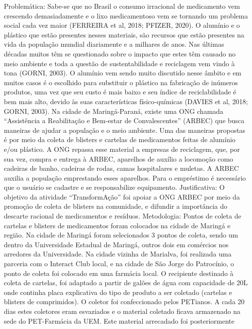 Problemática: Sabe-se que no Brasil o consumo irracional de medicamento vem crescendo 
demasiadamente e o lixo medicamentoso vem se tornando um problema social cada vez maior 
(FERREIRA et al, 2018; PFIZER, 2020). O alumínio e o plástico que estão presentes nesses 
materiais, são recursos que estão presentes na vida da população mundial diariamente e a milhares 
de anos. Nas últimas décadas muitos têm se questionado sobre o impacto que estes têm causado 
no meio ambiente e toda a questão de sustentabilidade e reciclagem vem vindo à tona (GORNI, 
2003). O alumínio vem sendo muito discutido nesse âmbito e em muitos casos é o escolhido para 
substituir o plástico na fabricação de inúmeros produtos, uma vez que seu custo é mais baixo e seu 
índice de reciclabilidade é bem mais alto, devido às suas características físico-químicas (DAVIES 
et al, 2018; GORNI, 2003). Na cidade de Maringá-Paraná, existe uma ONG chamada “Assistência 
a Reabilitação e Bem-estar de Convalescentes” (ARBEC) que busca maneiras de ajudar a 
população e o meio ambiente. Uma das maneiras propostas é por meio da coleta de blisters e 
cartelas de medicamentos feitas de alumínio e/ou plástico. A ONG repassa esse material a 
empresas de reciclagem, que, por sua vez, compra e entrega à ARBEC, aparelhos de auxílio a 
locomoção como cadeiras de banho, cadeiras de rodas, camas hospitalares e muletas. A ARBEC 
auxilia a população emprestando esses aparelhos. Para o empréstimo é necessário que o usuário se 
cadastre e se responsabilize equipamento. Justificativa: O objetivo da atividade “TransformAção” 
foi apoiar a ONG ARBEC por meio da promoção de coleta de blisters na comunidade, e difundir 
a importância do descarte racional de medicamentos e resíduos. Metodologia: Pontos de coleta de 
cartelas e blisters de medicamentos foram colocados na cidade de Maringá e região. Na cidade de 
Maringá foram selecionados 3 pontos de coleta, sendo um dentro da Universidade Estadual de 
Maringá, outros dois em comércios nos arredores da Universidade. Na cidade vizinha de Marialva, 
foi realizada uma parceria com o Interact Club local, e na cidade de São Jorge do Patrocínio, o 
ponto de coleta foi colocado em uma farmácia local. O recipiente destinado à coleta de cartelas, 
foi adaptado a partir de galões de água com capacidade de 20L onde continha placa explicativa do 
tipo de produto a ser coletado (cartelas e blisters de comprimidos). O coletor foi confeccionado 
pelos PETianos. A cada 20 dias estes coletores eram esvaziados e o material coletado ficava 
armazenado na sede do PET-Farmácia da UEM. Este material arrecadado foi posteriormente 
